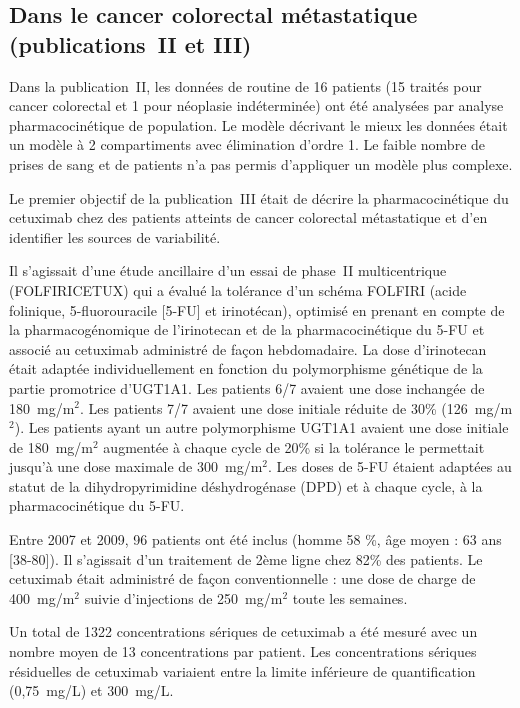 \subsection{Dans le cancer colorectal métastatique (publications~II et III)}
Dans la publication~II, les données de routine de 16 patients (15 traités pour cancer colorectal et 1 pour néoplasie indéterminée) ont été analysées par analyse pharmacocinétique de population. Le modèle décrivant le mieux les données était un modèle à 2 compartiments avec élimination d'ordre 1. Le faible nombre de prises de sang et de patients n'a pas permis d'appliquer un modèle plus complexe.

Le premier objectif de la publication~III était de décrire la pharmacocinétique du cetuximab chez des patients atteints de cancer colorectal métastatique et d'en identifier les sources de variabilité. 

Il s'agissait d'une étude ancillaire d'un essai de phase~II multicentrique (FOLFIRICETUX) qui a évalué la tolérance d'un schéma FOLFIRI (acide folinique, 5-fluorouracile [5-FU] et irinotécan), optimisé en prenant en compte de la pharmacogénomique de l'irinotecan et de la pharmacocinétique du 5-FU et associé au cetuximab administré de façon hebdomadaire. La dose d'irinotecan était adaptée individuellement en fonction du polymorphisme génétique de la partie promotrice d'UGT1A1. Les patients 6/7 avaient une dose inchangée de 180~mg/m$^2$. Les patients 7/7 avaient une dose initiale réduite de 30\% (126~mg/m$^2$). Les patients ayant un autre polymorphisme UGT1A1 avaient une dose initiale de 180~mg/m$^2$ augmentée à chaque cycle de 20\% si la tolérance le permettait jusqu'à une dose maximale de 300~mg/m$^2$. Les doses de 5-FU étaient adaptées au statut de la dihydropyrimidine déshydrogénase (DPD) et à chaque cycle, à la pharmacocinétique du 5-FU.

Entre 2007 et 2009, 96 patients ont été inclus (homme 58 \%, âge moyen : 63 ans [38-80]). Il s'agissait d'un traitement de 2ème ligne chez 82\% des patients. Le cetuximab était administré de façon conventionnelle : une dose de charge de 400~mg/m$^2$ suivie d'injections de 250~mg/m$^2$ toute les semaines. 

Un total de 1322 concentrations sériques de cetuximab a été mesuré avec un nombre moyen de 13 concentrations par patient. Les concentrations sériques résiduelles de cetuximab variaient entre la limite inférieure de quantification (0,75~mg/L) et 300~mg/L.

